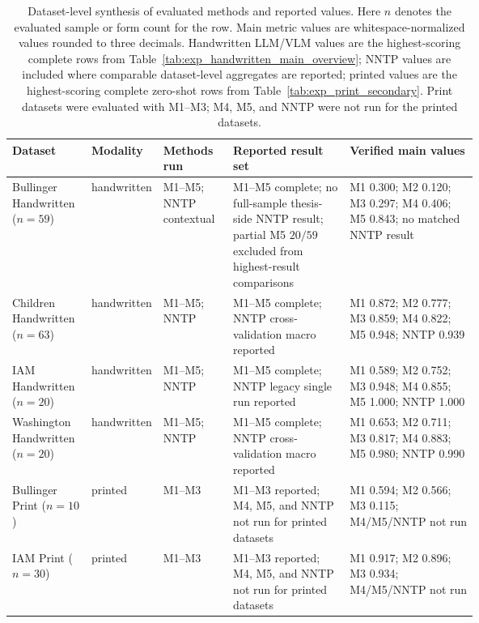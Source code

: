 \begin{table}[p]
  \centering
  \caption{Dataset-level synthesis of evaluated methods and reported values. Here \(n\) denotes the evaluated sample or form count for the row. Main metric values are whitespace-normalized \LANormCombined{} values rounded to three decimals. Handwritten LLM/VLM values are the highest-scoring complete rows from Table~\ref{tab:exp_handwritten_main_overview}; NNTP values are included where comparable dataset-level aggregates are reported; printed values are the highest-scoring complete zero-shot rows from Table~\ref{tab:exp_print_secondary}. Print datasets were evaluated with M1--M3; M4, M5, and NNTP were not run for the printed datasets.}
  \label{tab:app_result_synthesis_audit}
  \scriptsize
  \renewcommand{\arraystretch}{1.10}
  \setlength{\tabcolsep}{2pt}
  \begin{tabularx}{\linewidth}{@{}>{\raggedright\arraybackslash}p{0.17\linewidth}>{\raggedright\arraybackslash}p{0.10\linewidth}>{\raggedright\arraybackslash}p{0.15\linewidth}>{\raggedright\arraybackslash}p{0.25\linewidth}>{\raggedright\arraybackslash}X@{}}
    \toprule
    \textbf{Dataset} & \textbf{Modality} & \textbf{Methods run} & \textbf{Reported result set} & \textbf{Verified main values} \\
    \midrule
    Bullinger Handwritten (\(n=59\)) & handwritten & M1--M5; NNTP contextual & M1--M5 complete; no full-sample thesis-side NNTP result; partial \QwenThirtyTwoShort{} M5 \(20/59\) excluded from highest-result comparisons & M1 0.300; M2 0.120; M3 0.297; M4 0.406; M5 0.843; no matched NNTP result \\
    Children Handwritten (\(n=63\)) & handwritten & M1--M5; NNTP & M1--M5 complete; NNTP cross-validation macro reported & M1 0.872; M2 0.777; M3 0.859; M4 0.822; M5 0.948; NNTP 0.939 \\
    IAM Handwritten (\(n=20\)) & handwritten & M1--M5; NNTP & M1--M5 complete; NNTP legacy single run reported & M1 0.589; M2 0.752; M3 0.948; M4 0.855; M5 1.000; NNTP 1.000 \\
    Washington Handwritten (\(n=20\)) & handwritten & M1--M5; NNTP & M1--M5 complete; NNTP cross-validation macro reported & M1 0.653; M2 0.711; M3 0.817; M4 0.883; M5 0.980; NNTP 0.990 \\
    Bullinger Print (\(n=10\)) & printed & M1--M3 & M1--M3 reported; M4, M5, and NNTP not run for printed datasets & M1 0.594; M2 0.566; M3 0.115; M4/M5/NNTP not run \\
    IAM Print (\(n=30\)) & printed & M1--M3 & M1--M3 reported; M4, M5, and NNTP not run for printed datasets & M1 0.917; M2 0.896; M3 0.934; M4/M5/NNTP not run \\
    \bottomrule
  \end{tabularx}
\end{table}

